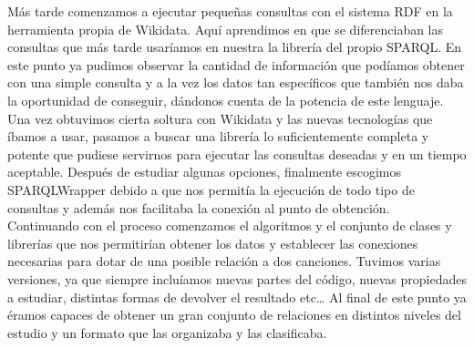 Más tarde comenzamos a ejecutar pequeñas consultas con el sistema RDF en la herramienta propia de Wikidata. Aquí aprendimos en que se diferenciaban las consultas que más tarde usaríamos en nuestra la librería del propio SPARQL. En este punto ya pudimos observar la cantidad de información que podíamos obtener con una simple consulta y a la vez los datos tan específicos que también nos daba la oportunidad de conseguir, dándonos cuenta de la potencia de este lenguaje.\\

Una vez obtuvimos cierta soltura con Wikidata y las nuevas tecnologías que íbamos a usar, pasamos a buscar una librería lo suficientemente completa y potente que pudiese servirnos para ejecutar las consultas deseadas y en un tiempo aceptable. Después de estudiar algunas opciones, finalmente escogimos SPARQLWrapper debido a que nos permitía la ejecución de todo tipo de consultas y además nos facilitaba la conexión al punto de obtención.\\

Continuando con el proceso comenzamos el algoritmos y el conjunto de clases y librerías que nos permitirían obtener los datos y establecer las conexiones necesarias para dotar de una posible relación a dos canciones. Tuvimos varias versiones, ya que siempre incluíamos nuevas partes del código, nuevas propiedades a estudiar, distintas formas de devolver el resultado etc… Al final de este punto ya éramos capaces de obtener un gran conjunto de relaciones en distintos niveles del estudio y un formato que las organizaba y las clasificaba.\\
